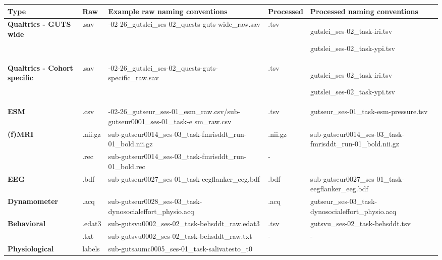 \documentclass[
  letterpaper,
  DIV=11,
  numbers=noendperiod]{scrreprt}
\begin{document}
\begin{tcolorbox}
\begin{longtable}[]{@{}
  >{\raggedright\arraybackslash}p{}
  >{\raggedright\arraybackslash}p{}
  >{\raggedright\arraybackslash}p{}
  >{\raggedright\arraybackslash}p{}
  >{\raggedright\arraybackslash}p{}@{}}
\toprule\noalign{}
\begin{minipage}[b]{\linewidth}\raggedright
Type
\end{minipage} & \begin{minipage}[b]{\linewidth}\raggedright
Raw
\end{minipage} & \begin{minipage}[b]{\linewidth}\raggedright
Example raw naming conventions
\end{minipage} & \begin{minipage}[b]{\linewidth}\raggedright
Processed
\end{minipage} & \begin{minipage}[b]{\linewidth}\raggedright
Processed naming conventions
\end{minipage} \\
\midrule\noalign{}
\endhead
\bottomrule\noalign{}
\endlastfoot
\textbf{Qualtrics - GUTS wide} & .sav &
2024-02-26\_gutslei\_ses-02\_quests-guts-wide\_raw.sav & .tsv &
gutslei\_ses-02\_task-iri.tsv

gutslei\_ses-02\_task-ypi.tsv \\
\textbf{Qualtrics - Cohort specific} & .sav &
2024-02-26\_gutslei\_ses-02\_quests-guts-specific\_raw.sav & .tsv &
gutslei\_ses-02\_task-iri.tsv

gutslei\_ses-02\_task-ypi.tsv \\
\textbf{ESM} & .csv &
2024-02-26\_gutseur\_ses-01\_esm\_raw.csv/sub-gutseur0001\_ses-01\_task-e
sm\_raw.csv & .tsv & gutseur\_ses-01\_task-esm-pressure.tsv \\
\textbf{(f)MRI} & .nii.gz &
sub-gutseur0014\_ses-03\_task-fmrisddt\_run-01\_bold.nii.gz & .nii.gz &
sub-gutseur0014\_ses-03\_task-fmrisddt\_run-01\_bold.nii.gz \\
& .rec & sub-gutseur0014\_ses-03\_task-fmrisddt\_run-01\_bold.rec & -
& \\
\textbf{EEG} & .bdf & sub-gutseur0027\_ses-01\_task-eegflanker\_eeg.bdf
& .bdf & sub-gutseur0027\_ses-01\_task-eegflanker\_eeg.bdf \\
\textbf{Dynamometer} & .acq &
sub-gutseur0028\_ses-03\_task-dynosocialeffort\_physio.acq & .acq &
gutseur\_ses-03\_task-dynosocialeffort\_physio.acq \\
\textbf{Behavioral} & .edat3 &
sub-gutsvu0002\_ses-02\_task-behsddt\_raw.edat3 & .tsv &
gutsvu\_ses-02\_task-behsddt.tsv \\
& .txt & sub-gutsvu0002\_ses-02\_task-behsddt\_raw.txt & - & - \\
\textbf{Physiological} & labels &
sub-gutsaumc0005\_ses-01\_task-salivatesto\_t0


\end{longtable}
\end{tcolorbox}
\end{document}
